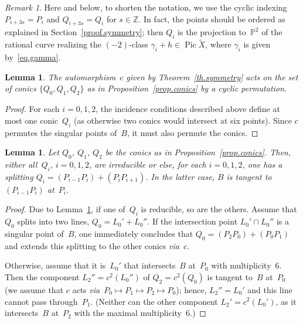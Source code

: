\documentclass{amsart}
\newtheorem{lemma}[subsubsection]{Lemma}
\theoremstyle{remark}
\newtheorem{remark}[subsubsection]{Remark}
\numberwithin{equation}{section}
\let\Bbb\mathbb
\let\Gg\gamma
\begin{document}
\begin{remark}
Here and below, to shorten the notation, we use the cyclic indexing
$P_{i+3s}=P_i$ and $Q_{i+3s}=Q_i$ for $s\in{\Bbb Z}$.
In fact, the points should be ordered as explained in
Section~\ref{proof.symmetry}; then $Q_i$ is the projection
to~${\Bbb P^{2}}$ of the rational curve realizing the $(-2)$-class
$\Gg_i+h\in{\operatorname{Pic}}{\tilde X}$, where $\Gg_i$ is given by~\eqref{eq.gamma}.
\end{remark}

\begin{lemma}\label{conics}
The automorphism~$c$ given by Theorem~\ref{th.symmetry} acts
on the set of conics $\{Q_0,Q_1,Q_2\}$
as in Proposition~\ref{prop.conics} by a cyclic permutation.
\end{lemma}

\begin{proof}
For each $i=0,1,2$, the incidence conditions described above
define at most one conic~$Q_i$ (as otherwise two conics would
intersect at six points). Since $c$ permutes the singular points
of~$B$, it must also permute the conics.
\end{proof}

\begin{lemma}\label{irreducible}
Let $Q_0$, $Q_1$, $Q_2$ be the conics as
in Proposition~\ref{prop.conics}.
Then, either all~$Q_i$, $i=0,1,2$, are irreducible
or else,
for each $i=0,1,2$, one has a splitting
$Q_i=(P_{i-1}P_i)+(P_iP_{i+1})$. In the latter case, $B$ is
tangent to $(P_{i-1}P_i)$ at~$P_i$.
\end{lemma}

\begin{proof}
Due to Lemma~\ref{conics}, if one
of~$Q_i$ is reducible, so are the others.
Assume that $Q_0$ splits into two lines, $Q_0=L_0'+L_0''$. If the
intersection point $L_0'\cap L_0''$ is a singular point of~$B$,
one immediately concludes that
$Q_0=(P_2P_0)+(P_0P_1)$ and extends this splitting to the other
conics {\emph{via}}~$c$.

Otherwise,
assume that it is~$L_0'$ that
intersects~$B$ at~$P_0$ with multiplicity~$6$. Then the component
$L_2''=c^2(L_0'')$ of $Q_2=c^2(Q_0)$ is tangent to~$B$ at~$P_0$
(we assume that $c$ acts {\emph{via}}\
$P_0\mapsto P_1\mapsto P_2\mapsto P_0$);
hence, $L_2''=L_0'$ and this line cannot pass through~$P_1$.
(Neither can the other component $L_2'=c^2(L_0')$, as it
intersects~$B$ at~$P_2$ with the maximal multiplicity~$6$.)
\end{proof}
\end{document}

